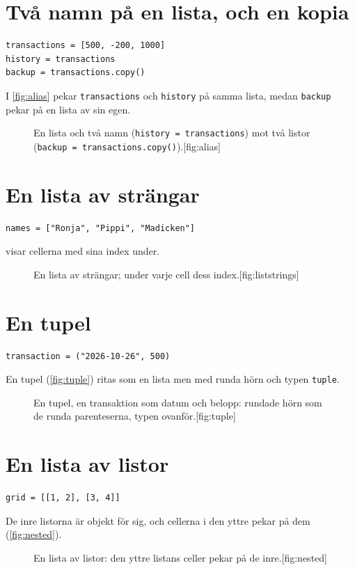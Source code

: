 \documentclass[a4paper,10pt,oneside,openright,
               oldfontcommands]{memoir}
\newcommand{\entry}[3]{%
  \begin{figure}[htbp]
    \begin{sidecaption}{#2}[fig:#1]
      #3
    \end{sidecaption}
  \end{figure}
}
\begin{document}
\section{Två namn på en lista, och en kopia}

\begin{verbatim}
transactions = [500, -200, 1000]
history = transactions
backup = transactions.copy()
\end{verbatim}
I \cref{fig:alias} pekar \texttt{transactions} och
\texttt{history} på samma lista, medan
\texttt{backup} pekar på en lista av sin egen.
\entry{alias}{En lista och två namn (\texttt{history = transactions})
  mot två listor (\texttt{backup = transactions.copy()}).}{\figAlias}

\section{En lista av strängar}

\begin{verbatim}
names = ["Ronja", "Pippi", "Madicken"]
\end{verbatim}
 visar cellerna med sina index under.
\entry{liststrings}{En lista av strängar; under varje cell dess
  index.}{\figListStrings}

\section{En tupel}

\begin{verbatim}
transaction = ("2026-10-26", 500)
\end{verbatim}
En tupel (\cref{fig:tuple}) ritas som en lista men med runda hörn och
typen \texttt{tuple}.
\entry{tuple}{En tupel, en transaktion som datum och belopp: rundade
  hörn som de runda parenteserna, typen ovanför.}{\figTuple}

\section{En lista av listor}

\begin{verbatim}
grid = [[1, 2], [3, 4]]
\end{verbatim}
De inre listorna är objekt för sig, och cellerna i den yttre pekar på
dem (\cref{fig:nested}).
\entry{nested}{En lista av listor: den yttre listans celler pekar på
  de inre.}{\figNested}
\end{document}
